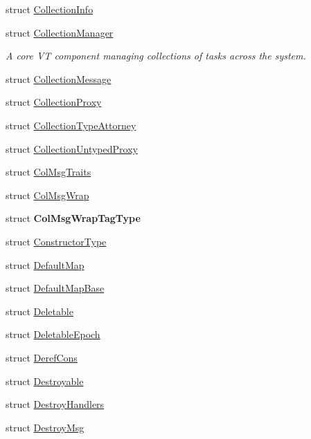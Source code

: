 \begin{DoxyCompactItemize}
struct \hyperlink{structvt_1_1vrt_1_1collection_1_1_collection_info}{Collection\+Info}
\item 
struct \hyperlink{structvt_1_1vrt_1_1collection_1_1_collection_manager}{Collection\+Manager}
\begin{DoxyCompactList}\small\item\em A core VT component managing collections of tasks across the system. \end{DoxyCompactList}\item 
struct \hyperlink{structvt_1_1vrt_1_1collection_1_1_collection_message}{Collection\+Message}
\item 
struct \hyperlink{structvt_1_1vrt_1_1collection_1_1_collection_proxy}{Collection\+Proxy}
\item 
struct \hyperlink{structvt_1_1vrt_1_1collection_1_1_collection_type_attorney}{Collection\+Type\+Attorney}
\item 
struct \hyperlink{structvt_1_1vrt_1_1collection_1_1_collection_untyped_proxy}{Collection\+Untyped\+Proxy}
\item 
struct \hyperlink{structvt_1_1vrt_1_1collection_1_1_col_msg_traits}{Col\+Msg\+Traits}
\item 
struct \hyperlink{structvt_1_1vrt_1_1collection_1_1_col_msg_wrap}{Col\+Msg\+Wrap}
\item 
struct {\bfseries Col\+Msg\+Wrap\+Tag\+Type}
\item 
struct \hyperlink{structvt_1_1vrt_1_1collection_1_1_constructor_type}{Constructor\+Type}
\item 
struct \hyperlink{structvt_1_1vrt_1_1collection_1_1_default_map}{Default\+Map}
\item 
struct \hyperlink{structvt_1_1vrt_1_1collection_1_1_default_map_base}{Default\+Map\+Base}
\item 
struct \hyperlink{structvt_1_1vrt_1_1collection_1_1_deletable}{Deletable}
\item 
struct \hyperlink{structvt_1_1vrt_1_1collection_1_1_deletable_epoch}{Deletable\+Epoch}
\item 
struct \hyperlink{structvt_1_1vrt_1_1collection_1_1_deref_cons}{Deref\+Cons}
\item 
struct \hyperlink{structvt_1_1vrt_1_1collection_1_1_destroyable}{Destroyable}
\item 
struct \hyperlink{structvt_1_1vrt_1_1collection_1_1_destroy_handlers}{Destroy\+Handlers}
\item 
struct \hyperlink{structvt_1_1vrt_1_1collection_1_1_destroy_msg}{Destroy\+Msg}
\item 

\end{DoxyCompactItemize}

